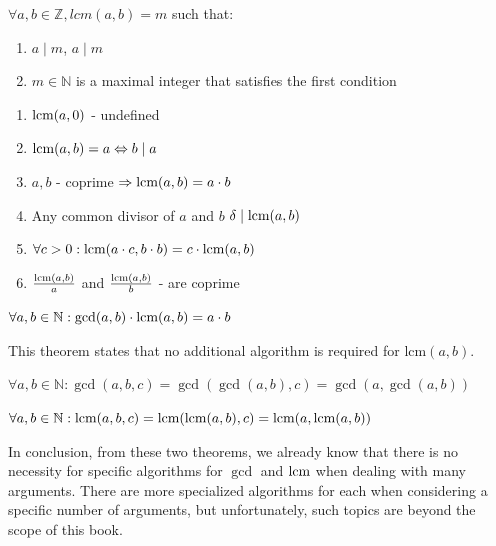 \documentclass[../lecture-notes.tex]{subfiles}
\begin{document}
\begin{definition}
    $\forall a, b \in \mathbb{Z}, lcm(a, b) = m$ such that:
    \begin{enumerate}
        \item $a \mid m$, $a \mid m$
        \item $m \in \mathbb{N}$ is a maximal integer that satisfies the first condition 
    \end{enumerate}
\end{definition}

\begin{lemma} 
    \hfil
    \begin{enumerate}
        \item $\text{lcm}(a, 0)$ - undefined
        \item $\text{lcm}(a, b) = a \Leftrightarrow b \mid a$
        \item $a, b$ - coprime $\Rightarrow \text{lcm}(a, b) = a \cdot b$
        \item Any common divisor of $a$ and $b$ $\delta \mid \text{lcm}(a, b)$
        \item $\forall c > 0: \text{lcm}(a \cdot c, b \cdot b) =  c \cdot \text{lcm}(a, b)$
        \item $\frac{\text{lcm}(a, b)}{a}$ and $\frac{\text{lcm}(a, b)}{b}$ - are coprime
    \end{enumerate}
\end{lemma}

\begin{theorem}
    $\forall a, b \in \mathbb{N}: \text{gcd}(a, b) \cdot \text{lcm}(a, b) = a \cdot b$
\end{theorem}

This theorem states that no additional algorithm is required for $\text{lcm}(a, b)$.

\begin{theorem}
    $\forall a, b \in \mathbb{N}: \gcd(a, b, c) = \gcd(\gcd(a, b), c) = \gcd(a, \gcd(a, b))$
\end{theorem}

\begin{theorem}
    $\forall a, b \in \mathbb{N}: \text{lcm}(a, b, c) = \text{lcm}(\text{lcm}(a, b), c) = \text{lcm}(a, \text{lcm}(a, b))$
\end{theorem}

In conclusion, from these two theorems, we already know that there is no necessity for specific algorithms for $\gcd$ and $\text{lcm}$ when dealing with many arguments. There are more specialized algorithms for each when considering a specific number of arguments, but unfortunately, such topics are beyond the scope of this book.
\end{document}
